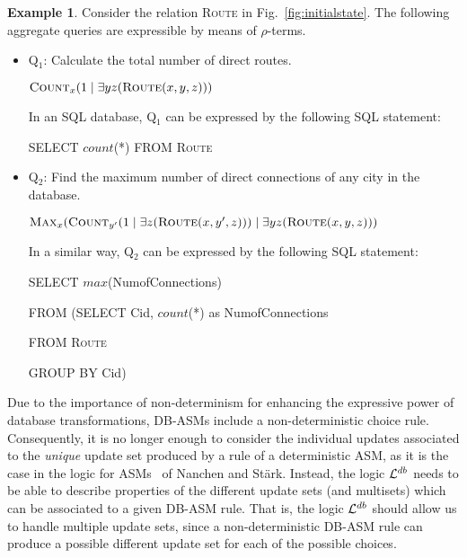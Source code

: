 \documentclass[preprint,11pt]{elsarticle}
\theoremstyle{definition}
\newtheorem{example}{Example}[section]
\theoremstyle{remark}
\begin{document}
\begin{example}\label{exa:logic-syntax-term}
Consider the relation \textsc{Route} in
Fig.~\ref{fig:initialstate}. The following aggregate
queries are expressible by means of $\rho$-terms.

\begin{itemize}
  \item Q$_1$: Calculate the total number of direct routes.

\begin{center}
    $\textsc{Count}_{x}(1 \mid \exists y z (\textsc{Route}(x,y,z)))$
\end{center}

In an SQL database, Q$_1$ can be expressed by the following SQL
statement:\smallskip

    \begin{center}
    SELECT $count$(*) FROM \textsc{Route}
    \end{center}

  \item Q$_2$: Find the maximum number of direct connections of any city in the database.

\begin{center}
    $\textsc{Max}_{x} (\textsc{Count}_{y'}(1 \mid \exists z (\textsc{Route}(x,y',z))) \mid \exists y z (\textsc{Route}(x,y,z)))$
\end{center}

In a similar way, Q$_2$ can be expressed by the following SQL
statement:

\bigskip
          \hspace{1.5cm}SELECT $max$(NumofConnections)

          \hspace{1.5cm}FROM (SELECT Cid, $count$(*) as NumofConnections

                \hspace{2.85cm}FROM \textsc{Route}

                \hspace{2.85cm}GROUP BY Cid)


\end{itemize}

\end{example}

Due to the importance of non-determinism for enhancing the expressive power of database transformations, DB-ASMs include a non-deterministic choice rule. Consequently, it is no longer enough to consider the individual updates associated to the \emph{unique} update set produced by a rule of a deterministic ASM, as it is the case in the logic for ASMs~\cite{RobertLogicASM} of Nanchen and St\"ark. Instead, the logic ${\cal L}^{db}$ needs to be able to describe properties of the different update sets (and multisets) which can be associated to a given DB-ASM rule. That is, the logic ${\cal L}^{db}$ should allow us to handle multiple update sets, since a non-deterministic DB-ASM rule can produce a possible different update set for each of the possible choices.
\end{document}

